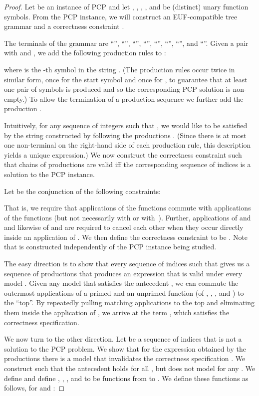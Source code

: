\begin{proof}
Let  be an instance of PCP and let , , , , and  be (distinct) unary function symbols. 
From the PCP instance, we will construct an EUF-compatible tree grammar  and a correctness constraint . 



The terminals of the grammar are ``'', ``'', ``'', ``'', ``'', ``'', ``'', and ``''.
Given a pair  with  and , we add the following production rules to :


where  is the -th symbol in the string .
(The production rules occur twice in similar form, once for the start symbol  and once for , to guarantee that at least one pair of symbols  is produced and so the corresponding PCP solution is non-empty.)
To allow the termination of a production sequence we further add the production .

Intuitively, for any sequence of integers  such that , we would like  to be satisfied by the string constructed by following the productions .
(Since there is at most one non-terminal on the right-hand side of each production rule, this description yields a unique expression.)
We now construct the correctness constraint  such that chains of productions are valid iff the corresponding sequence of indices is a solution to the PCP instance.

Let  be the conjunction of the following constraints:


That is, we require that applications of the functions  commute with applications of the functions  (but not necessarily  with  or  with~). 
Further, applications of  and  and likewise of  and  are required to cancel each other when they occur directly inside an application of . 
We then define the correctness constraint  to be . 
Note that  is constructed independently of the PCP instance being studied. 



The easy direction is to show that every sequence of indices  such that  gives us a sequence of productions  that produces an expression that is valid under every model .
Given any model  that satisfies the antecedent , we can commute the outermost applications of a primed and an unprimed function (of , , , and ) to the ``top''. 
By repeatedly pulling matching applications to the top and eliminating them inside the application of , we arrive at the term , which satisfies the correctness specification.






We now turn to the other direction. 
Let  be a sequence of indices that is not a solution to the PCP problem. 
We show that for the expression obtained by the productions  there is a model that invalidates the correctness specification . 
We construct  such that the antecedent  holds for all , but  does not model  for any . 
We define  and define , , , and  to be functions from   to . 
We define these functions as follows, for  and :



\end{proof}
